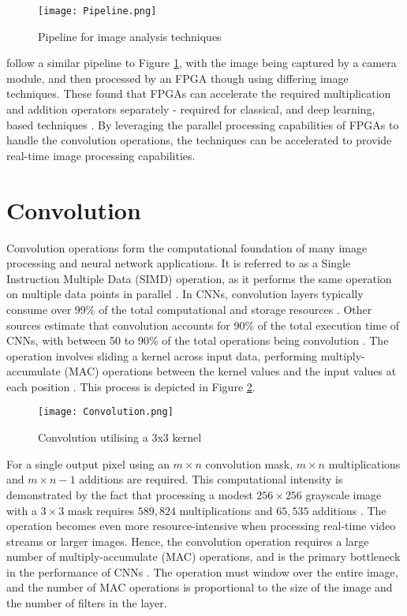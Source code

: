 \begin{figure}[h]
    \centering
    \texttt{[image: Pipeline.png]}
    \caption{Pipeline for image analysis techniques \cite{RTEdge}}
    \label{fig:pipeline}
\end{figure}

\cite{SoCImage, Aerial} follow a similar pipeline to Figure \ref{fig:pipeline}, with the image being captured by a camera module, and then processed by an FPGA though using differing image techniques.
These found that FPGAs can accelerate the required multiplication and addition operators separately - required for classical, and deep learning, based techniques \cite{ResourceEfficient}.
By leveraging the parallel processing capabilities of FPGAs to handle the convolution operations, the techniques can be accelerated to provide real-time image processing capabilities.

\section{Convolution}
Convolution operations form the computational foundation of many image processing and neural network applications.
It is referred to as a Single Instruction Multiple Data (SIMD) operation, as it performs the same operation on multiple data points in parallel \cite{7}.
In CNNs, convolution layers typically consume over 99\% of the total computational and storage resources \cite{18}.
Other sources estimate that convolution accounts for 90\% of the total execution time of CNNs, with between 50 to 90\% of the total operations being convolution \cite{3, 2}.
The operation involves sliding a kernel across input data, performing multiply-accumulate (MAC) operations between the kernel values and the input values at each position \cite{7}.
This process is depicted in Figure \ref{fig:convolution}.

\begin{figure}[h]
    \centering
    \texttt{[image: Convolution.png]}
    \caption{Convolution utilising a 3x3 kernel \cite{19}}
    \label{fig:convolution}
\end{figure}

For a single output pixel using an \(m \times n\) convolution mask, \(m \times n\) multiplications and \(m \times n-1\) additions are required. 
This computational intensity is demonstrated by the fact that processing a modest \(256 \times 256\) grayscale image with a \(3 \times 3\) mask requires \(589,824\) multiplications and \(65,535\) additions \cite{7}. 
The operation becomes even more resource-intensive when processing real-time video streams or larger images.
Hence, the convolution operation requires a large number of multiply-accumulate (MAC) operations, and is the primary bottleneck in the performance of CNNs \cite{11}.
The operation must window over the entire image, and the number of MAC operations is proportional to the size of the image and the number of filters in the layer.

